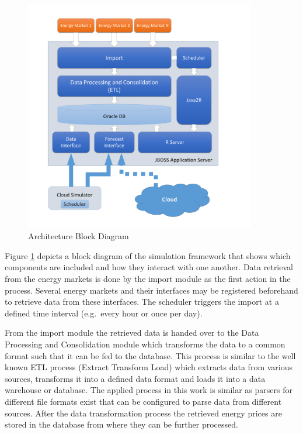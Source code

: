 \begin{figure}[htbp]
	\centering
		\includegraphics[width=0.9\textwidth]{figures/results/Block_Diagram_Architecture.pdf}
	\caption{Architecture Block Diagram}
	\label{fig:Block_Diagram_Architecture}
\end{figure}

Figure \ref{fig:Block_Diagram_Architecture} depicts a block diagram of the simulation framework that shows which components are included and how they interact with one another. Data retrieval from the energy markets is done by the import module as the first action in the process. Several energy markets and their interfaces may be registered beforehand to retrieve data from these interfaces. The scheduler triggers the import at a defined time interval (e.g.~every hour or once per day). 

From the import module the retrieved data is handed over to the Data Processing and Consolidation module which transforms the data to a common format such that it can be fed to the database. This process is similar to the well known ETL process (Extract Transform Load) which extracts data from various sources, transforms it into a defined data format and loads it into a data warehouse or database. The applied process in this work is similar as parsers for different file formats exist that can be configured to parse data from different sources. After the data transformation process the retrieved energy prices are stored in the database from where they can be further processed. 

